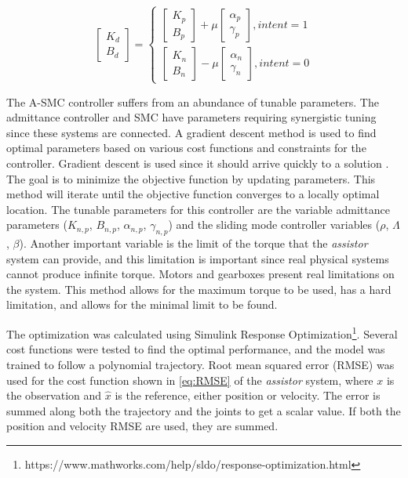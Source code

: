 \begin{equation}
    \begin{bmatrix} K_d \\ B_d \end{bmatrix} = \begin{cases}
        \begin{bmatrix} K_{p} \\ B_{p} \end{bmatrix} + \mu  \begin{bmatrix} \alpha_p  \\ \gamma_p \end{bmatrix}, intent = 1 \\
        \begin{bmatrix} K_{n} \\ B_{n} \end{bmatrix} - \mu  \begin{bmatrix} \alpha_n  \\ \gamma_n \end{bmatrix}, intent = 0
  \end{cases}
  \label{eq:varible}
\end{equation}


The A-SMC controller suffers from an abundance of tunable parameters. The admittance controller and SMC have parameters requiring synergistic tuning since these systems are connected. A gradient descent method is used to find optimal parameters based on various cost functions and constraints for the controller. Gradient descent is used since it should arrive quickly to a solution  \cite{piltan2012performance} \cite{wang1996course}. The goal is to minimize the objective function by updating parameters. This method will iterate until the objective function converges to a locally optimal location. The tunable parameters for this controller are the variable admittance parameters ($K_{n,p}$, $B_{n,p}$, $\alpha_{n,p}$, $\gamma_{n,p}$) and the sliding mode controller variables ($\rho$, $\Lambda$, $\beta$).  Another important variable is the limit of the torque that the \textit{assistor} system can provide, and this limitation is important since real physical systems cannot produce infinite torque. Motors and gearboxes present real limitations on the system. This method allows for the maximum torque to be used, has a hard limitation, and allows for the minimal limit to be found.


The optimization was calculated using Simulink Response Optimization\footnote{https://www.mathworks.com/help/sldo/response-optimization.html}. Several cost functions were tested to find the optimal performance, and the model was trained to follow a polynomial trajectory. Root mean squared error (RMSE) was used for the cost function shown in \autoref{eq:RMSE} of the \textit{assistor} system, where $x$ is the observation and $\hat{x}$ is the reference, either position or velocity. The error is summed along both the trajectory and the joints to get a scalar value. If both the position and velocity RMSE are used, they are summed.

